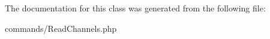 

The documentation for this class was generated from the following file\+:\begin{DoxyCompactItemize}
\item 
commands/Read\+Channels.\+php\end{DoxyCompactItemize}
